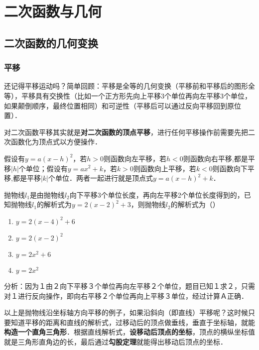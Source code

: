 \section{二次函数与几何}



\subsection{二次函数的几何变换}

\subsubsection*{平移}
还记得平移运动吗？简单回顾：平移是全等的几何变换（平移前和平移后的图形全等），平移具有交换性（比如一个正方形先向上平移3个单位再向左平移3个单位，如果颠倒顺序，最终位置相同）和可逆性（平移后可以通过反向平移回到原位置）．
\par
对二次函数平移其实就是\textbf{对二次函数的顶点平移}，进行任何平移操作前需要先把二次函数化为顶点式以方便操作．
\par
假设有\(y=a(x-h)^2\)，若\(h>0\)则函数向左平移，若\(h<0\)则函数向右平移,都是平移\(|h|\)个单位；假设有\(y=ax^2+k\)，若\(k>0\)则函数向上平移，若\(k<0\)则函数向下平移,都是平移\(|k|\)个单位．两者一起进行就是顶点式\(y=a(x-h)^2+k\)．
\par
\begin{example}抛物线\( l_1 \)是由抛物线\( l_2 \)向下平移3个单位长度，再向左平移2个单位长度得到的，已知抛物线\( l_1 \)的解析式为\( y=2(x-2)^2+3 \)，则抛物线\( l_2 \)的解析式为（\hspace{3.5em}）

\begin{enumerate}[label=\Alph*.]
    \item \( y=2(x-4)^2+6 \)
    \item \( y=2(x-2)^2 \)
    \item \( y=2x^2+6 \)
    \item \( y=2x^2 \)
\end{enumerate}
\end{example}
\begin{solution}
    分析：因为１由２向下平移３个单位再向左平移２个单位，题目已知１求２，只需对１进行反向操作，即向右平移２个单位再向上平移３单位，经过计算Ａ正确．
\end{solution}
以上是抛物线沿坐标轴方向平移的例子，如果沿斜向（即直线）平移呢？这时候只要知道平移的距离和直线的解析式，过移动后的顶点做垂线，垂直于坐标轴，就能\textbf{构造一个直角三角形}．根据直线解析式，\textbf{设移动后顶点的坐标}，顶点的横纵坐标值就是三角形直角边的长，最后通过\textbf{勾股定理}就能得出移动后顶点的坐标．
